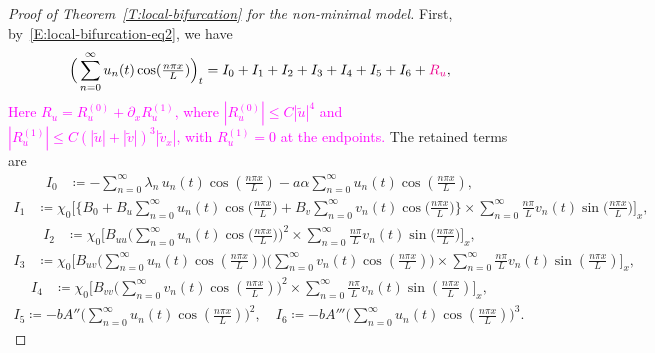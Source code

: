 \documentclass[11pt]{article} %
\theoremstyle{remark}
\theoremstyle{remark}
\numberwithin{equation}{section}
\numberwithin{figure}{section}
\numberwithin{table}{section}
\begin{document}
\begin{proof}[Proof of Theorem~\ref{T:local-bifurcation}  for the non-minimal model]
  First, by~\eqref{E:local-bifurcation-eq2}, we have
  \begin{align}\label{E:u_n-eq}
    \Big(\sum_{n=0}^\infty u_n(t)\cos(\tfrac{n\pi x}{L})\Big)_t =I_0 + I_1 + I_2
    + I_3 + I_4 + I_5 + I_6
    + \textcolor{magenta}{R_u},
  \end{align}
  \textcolor{magenta}{Here $R_u=R_u^{(0)}+\partial_xR_u^{(1)}$, where $|R_u^{(0)}|\le C|\tilde{u}|^4$ and $|R_u^{(1)}|\le C\left(|\tilde{u}|+|\tilde{v}|\right)^3|\tilde{v}_x|$, with $R_u^{(1)}=0$ at the endpoints.}
  The retained terms are
  \begin{align*}
    I_0
    &\coloneqq -\sum_{n=0}^\infty \lambda_n\,u_n(t)\cos(\tfrac{n\pi x}{L}) - {
    a\alpha  \sum_{n=0}^\infty u_n(t)\cos(\tfrac{n\pi x}{L}) },
  \end{align*}
  \begin{align*}
    I_1
    &\coloneqq \chi_0 \Big[ \Big\{B_0
    + B_u\sum_{n=0}^\infty u_n(t)\cos\big(\tfrac{n\pi x}{L}\big)
    + B_v\sum_{n=0}^\infty v_n(t)\cos\big(\tfrac{n\pi x}{L}\big)
    \Big\} \times
    \sum_{n=0}^\infty \tfrac{n\pi}{L} v_n(t)\sin\big(\tfrac{n\pi x}{L}\big)
    \Big]_x,
  \end{align*}
  \begin{align*}
    I_2
    &\coloneqq
    \chi_0
    \Big[
    B_{uu}\Big(\sum_{n=0}^\infty u_n(t)\cos\big(\tfrac{n\pi x}{L}\big)\Big)^2
    \times
    \sum_{n=0}^\infty \tfrac{n\pi}{L} v_n(t)\sin\big(\tfrac{n\pi x}{L}\big)
    \Big]_x,
  \end{align*}
  \begin{align*}
    I_3
    &\coloneqq
    \chi_0
    \Big[
    B_{uv}\big(\sum_{n=0}^\infty u_n(t)\cos(\tfrac{n\pi x}{L})\big)
    \big(\sum_{n=0}^\infty v_n(t)\cos(\tfrac{n\pi x}{L})\big)
    \times \sum_{n=0}^\infty \tfrac{n\pi}{L} v_n(t)\sin(\tfrac{n\pi x}{L})
    \Big]_x,
  \end{align*}
  \begin{align*}
    I_4
    &\coloneqq
    \chi_0
    \Big[
    B_{vv}\big(\sum_{n=0}^\infty v_n(t)\cos(\tfrac{n\pi x}{L})\big)^2
    \times
    \sum_{n=0}^\infty \tfrac{n\pi}{L} v_n(t)\sin(\tfrac{n\pi x}{L})
    \Big]_x,
  \end{align*}
  \begin{align*}
    I_5
    \coloneqq
    - bA''
    \Big(\sum_{n=0}^\infty u_n(t)\cos(\tfrac{n\pi x}{L})\Big)^2,
    \quad
    I_6\coloneqq
    - b A'''
    \Big(\sum_{n=0}^\infty u_n(t)\cos(\tfrac{n\pi x}{L})\Big)^3.
  \end{align*}


\end{proof}
\end{document}
